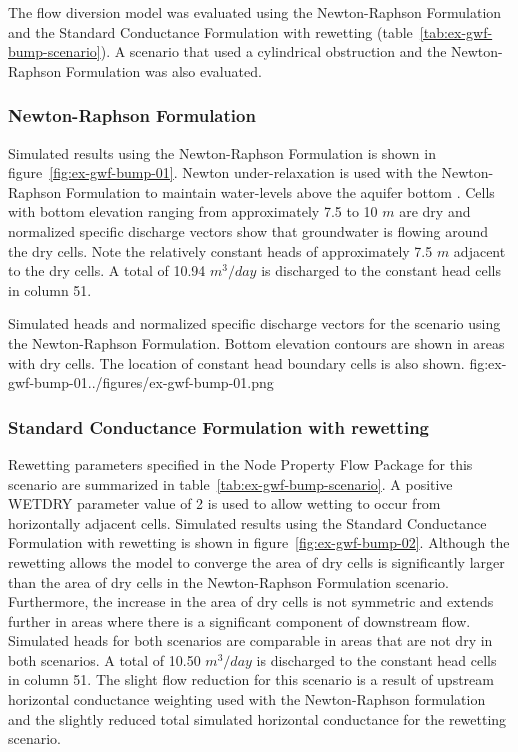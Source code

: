 The flow diversion model was evaluated using the Newton-Raphson Formulation and the Standard Conductance Formulation with rewetting (table~\ref{tab:ex-gwf-bump-scenario}). A scenario that used a cylindrical obstruction and the Newton-Raphson Formulation was also evaluated.



\subsubsection{Newton-Raphson Formulation}

Simulated results using the Newton-Raphson Formulation is shown in figure~\ref{fig:ex-gwf-bump-01}. Newton under-relaxation is used with the Newton-Raphson Formulation to maintain water-levels above the aquifer bottom \citep{modflow6framework}. Cells with bottom elevation ranging from approximately 7.5 to 10 $m$ are dry and normalized specific discharge vectors show that groundwater is flowing around the dry cells. Note the relatively constant heads of approximately 7.5 $m$ adjacent to the dry cells. A total of 10.94 $m^3/day$ is discharged to the constant head cells in column 51.


\begin{StandardFigure}{
                                     Simulated heads and normalized specific discharge vectors for the scenario using 
                                     the Newton-Raphson Formulation. Bottom elevation contours are shown in areas 
                                     with dry cells. The location of constant head boundary cells is also shown.
                                     }{fig:ex-gwf-bump-01}{../figures/ex-gwf-bump-01.png}
\end{StandardFigure}                                 

\subsubsection{Standard Conductance Formulation with rewetting}

Rewetting parameters specified in the Node Property Flow Package for this scenario are summarized in table~\ref{tab:ex-gwf-bump-scenario}. A positive WETDRY parameter value of 2 is used to allow wetting to occur from horizontally adjacent cells. Simulated results using the Standard Conductance Formulation with rewetting is shown in figure~\ref{fig:ex-gwf-bump-02}. Although the rewetting allows the model to converge the area of dry cells is significantly larger than the area of dry cells in the Newton-Raphson Formulation scenario. Furthermore, the increase in the area of dry cells is not symmetric and extends further in areas where there is a significant component of downstream flow. Simulated heads for both scenarios are comparable in areas that are not dry in both scenarios. A total of 10.50 $m^3/day$ is discharged to the constant head cells in column 51. The slight flow reduction for this scenario is a result of upstream horizontal conductance weighting used with the Newton-Raphson formulation and the slightly reduced total simulated horizontal conductance for the rewetting scenario. 

